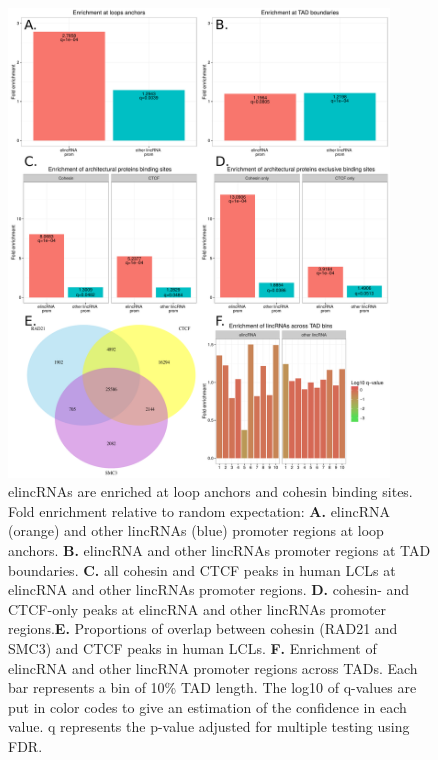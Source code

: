 \documentclass[11pt,a4paper]{report}
\begin{document}
\begin{figure}[ht]
	\includegraphics[width=0.9\textwidth]{Figures/2_Enrichment.pdf}
	\caption{elincRNAs are enriched at loop anchors and cohesin binding sites. Fold enrichment relative to random expectation: \textbf{A.} elincRNA (orange) and other lincRNAs (blue) promoter regions at loop anchors. \textbf{B.} elincRNA and other lincRNAs promoter regions at TAD boundaries. \textbf{C.} all cohesin and CTCF peaks in human LCLs at elincRNA and other lincRNAs promoter regions. \textbf{D.} cohesin- and CTCF-only peaks at elincRNA and other lincRNAs promoter regions.\textbf{E.} Proportions of overlap between cohesin (RAD21 and SMC3) and CTCF peaks in human LCLs. \textbf{F.} Enrichment of elincRNA and other lincRNA promoter regions across TADs. Each bar represents a bin of 10\% TAD length. The log10 of q-values are put in color codes to give an estimation of the confidence in each value. q represents the p-value adjusted for multiple testing using FDR.}
	\label{enrich_elinc}
\end{figure}
\end{document}
